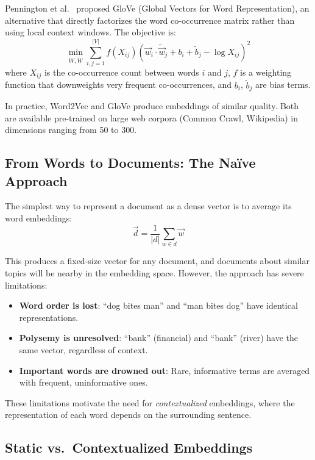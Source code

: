 \documentclass[11pt,a4paper]{article}
\theoremstyle{definition}
\theoremstyle{plain}
\begin{document}
Pennington et al.~\cite{pennington2014glove} proposed GloVe (Global Vectors for Word Representation), an alternative that directly factorizes the word co-occurrence matrix rather than using local context windows. The objective is:
\begin{equation}
\min_{W, \tilde{W}} \sum_{i,j=1}^{|V|} f(X_{ij}) \left(\vec{w}_i \cdot \tilde{\vec{w}}_j + b_i + \tilde{b}_j - \log X_{ij}\right)^2
\end{equation}
where $X_{ij}$ is the co-occurrence count between words $i$ and $j$, $f$ is a weighting function that downweights very frequent co-occurrences, and $b_i$, $\tilde{b}_j$ are bias terms.

In practice, Word2Vec and GloVe produce embeddings of similar quality. Both are available pre-trained on large web corpora (Common Crawl, Wikipedia) in dimensions ranging from 50 to 300.

\subsection{From Words to Documents: The Na\"ive Approach}

The simplest way to represent a document as a dense vector is to average its word embeddings:
\begin{equation}
\vec{d} = \frac{1}{|d|} \sum_{w \in d} \vec{w}
\end{equation}

This produces a fixed-size vector for any document, and documents about similar topics will be nearby in the embedding space. However, the approach has severe limitations:
\begin{itemize}
    \item \textbf{Word order is lost}: ``dog bites man'' and ``man bites dog'' have identical representations.
    \item \textbf{Polysemy is unresolved}: ``bank'' (financial) and ``bank'' (river) have the same vector, regardless of context.
    \item \textbf{Important words are drowned out}: Rare, informative terms are averaged with frequent, uninformative ones.
\end{itemize}

These limitations motivate the need for \emph{contextualized} embeddings, where the representation of each word depends on the surrounding sentence.

\subsection{Static vs.\ Contextualized Embeddings}
\end{document}
